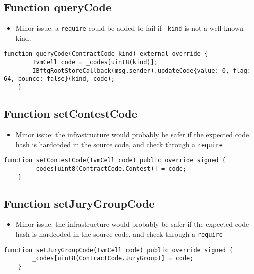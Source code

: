 \subsection{Function queryCode}

\begin{itemize}
\item Minor issue: a {\tt require} could be added to fail if {\tt
  kind} is not a well-known kind.
\end{itemize}

\begin{lstlisting}[firstnumber=21]
    function queryCode(ContractCode kind) external override {
        TvmCell code = _codes[uint8(kind)];
        IBftgRootStoreCallback(msg.sender).updateCode{value: 0, flag: 64, bounce: false}(kind, code);
    }
\end{lstlisting}

\subsection{Function setContestCode}

\begin{itemize}
\item Minor issue: the infrastructure would probably be safer if the
  expected code hash is hardcoded in the source code, and check
  through a {\tt require}
\end{itemize}

\begin{lstlisting}[firstnumber=17]
    function setContestCode(TvmCell code) public override signed {
        _codes[uint8(ContractCode.Contest)] = code;
    }
\end{lstlisting}

\subsection{Function setJuryGroupCode}

\begin{itemize}
\item Minor issue: the infrastructure would probably be safer if the
  expected code hash is hardcoded in the source code, and check
  through a {\tt require}
\end{itemize}

\begin{lstlisting}[firstnumber=13]
    function setJuryGroupCode(TvmCell code) public override signed {
        _codes[uint8(ContractCode.JuryGroup)] = code;
    }
\end{lstlisting}
